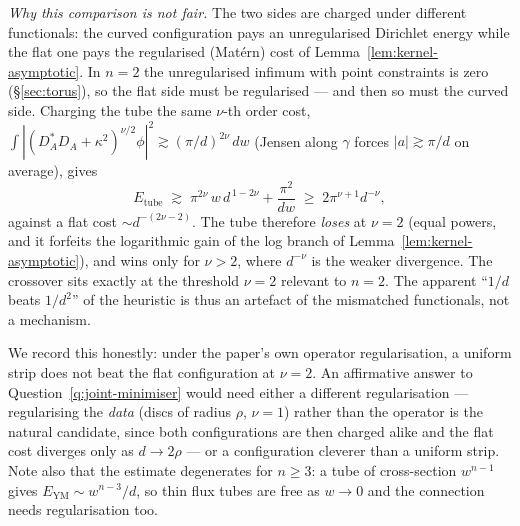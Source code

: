 \emph{Why this comparison is not fair.} The two sides are charged
under different functionals: the curved configuration pays an
unregularised Dirichlet energy while the flat one pays the
regularised (Mat\'ern) cost of Lemma~\ref{lem:kernel-asymptotic}. In
$n=2$ the unregularised infimum with point constraints is zero
(\S\ref{sec:torus}), so the flat side must be regularised --- and
then so must the curved side. Charging the tube the same
$\nu$-th order cost, $\int|(D_A^*D_A+\kappa^2)^{\nu/2}\phi|^2
\gtrsim (\pi/d)^{2\nu}\,dw$ (Jensen along $\gamma$ forces
$|a|\gtrsim\pi/d$ on average), gives
\[
   E_{\text{tube}} \;\gtrsim\;
   \pi^{2\nu}\,w\,d^{\,1-2\nu}+\frac{\pi^2}{dw}
   \;\geq\; 2\pi^{\nu+1}d^{-\nu},
\]
against a flat cost $\sim d^{-(2\nu-2)}$. The tube therefore
\emph{loses} at $\nu=2$ (equal powers, and it forfeits the
logarithmic gain of the log branch of
Lemma~\ref{lem:kernel-asymptotic}), and wins only for $\nu>2$, where
$d^{-\nu}$ is the weaker divergence. The crossover sits exactly at
the threshold $\nu=2$ relevant to $n=2$. The apparent
``$1/d$ beats $1/d^2$'' of the heuristic is thus an artefact of the
mismatched functionals, not a mechanism.

We record this honestly: under the paper's own operator
regularisation, a uniform strip does not beat the flat configuration
at $\nu=2$. An affirmative answer to
Question~\ref{q:joint-minimiser} would need either a different
regularisation --- regularising the \emph{data} (discs of radius
$\rho$, $\nu=1$) rather than the operator is the natural candidate,
since both configurations are then charged alike and the flat cost
diverges only as $d\to 2\rho$ --- or a configuration cleverer than a
uniform strip. Note also that the estimate degenerates for
$n\geq 3$: a tube of cross-section $w^{n-1}$ gives
$E_{\mathrm{YM}}\sim w^{n-3}/d$, so thin flux tubes are free as
$w\to 0$ and the connection needs regularisation too.

